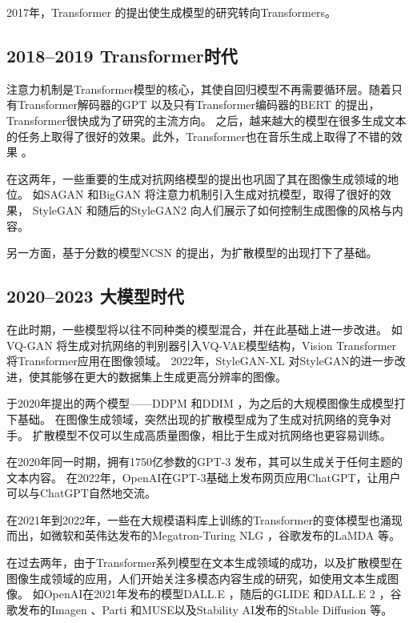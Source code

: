 2017年，Transformer {\cite{vaswani2017attention}}的提出使生成模型的研究转向Transformers。
\subsection{2018--2019 Transformer时代}
注意力机制是Transformer模型的核心，其使自回归模型不再需要循环层。随着只有Transformer解码器的GPT {\cite{radford2018improving}}以及只有Transformer编码器的BERT {\cite{devlin2018bert}}的提出，Transformer很快成为了研究的主流方向。
之后，越来越大的模型在很多生成文本的任务上取得了很好的效果。此外，Transformer也在音乐生成上取得了不错的效果 {\cite{huang2018music}}。

在这两年，一些重要的生成对抗网络模型的提出也巩固了其在图像生成领域的地位。
如SAGAN {\cite{zhang2019self}}和BigGAN {\cite{brock2018large}}将注意力机制引入生成对抗模型，取得了很好的效果，
StyleGAN {\cite{karras2019style}}和随后的StyleGAN2 {\cite{karras2020analyzing}}向人们展示了如何控制生成图像的风格与内容。

另一方面，基于分数的模型NCSN {\cite{song2019generative}}的提出，为扩散模型的出现打下了基础。
\subsection{2020--2023 大模型时代}
在此时期，一些模型将以往不同种类的模型混合，并在此基础上进一步改进。
如VQ-GAN {\cite{esser2021taming}}将生成对抗网络的判别器引入VQ-VAE模型结构，Vision Transformer {\cite{dosovitskiy2020image}}将Transformer应用在图像领域。
2022年，StyleGAN-XL {\cite{sauer2022stylegan}}对StyleGAN的进一步改进，使其能够在更大的数据集上生成更高分辨率的图像。

于2020年提出的两个模型——DDPM {\cite{ho2020denoising}}和DDIM {\cite{song2020denoising}}，为之后的大规模图像生成模型打下基础。
在图像生成领域，突然出现的扩散模型成为了生成对抗网络的竞争对手。
扩散模型不仅可以生成高质量图像，相比于生成对抗网络也更容易训练。

在2020年同一时期，拥有1750亿参数的GPT-3 {\cite{brown2020language}}发布，其可以生成关于任何主题的文本内容。
在2022年，OpenAI在GPT-3基础上发布网页应用ChatGPT，让用户可以与ChatGPT自然地交流。

在2021年到2022年，一些在大规模语料库上训练的Transformer的变体模型也涌现而出，如微软和英伟达发布的Megatron-Turing NLG {\cite{smith2022using}}，谷歌发布的LaMDA {\cite{thoppilan2022lamda}}等。

在过去两年，由于Transformer系列模型在文本生成领域的成功，以及扩散模型在图像生成领域的应用，人们开始关注多模态内容生成的研究，如使用文本生成图像。
如OpenAI在2021年发布的模型DALL.E {\cite{ramesh2021zero}}，随后的GLIDE {\cite{nichol2021glide}}和DALL.E 2 {\cite{ramesh2022hierarchical}}，谷歌发布的Imagen {\cite{saharia2022photorealistic}}、Parti {\cite{yu2022scaling}}和MUSE以及Stability AI发布的Stable Diffusion {\cite{rombach2022high}}等。
